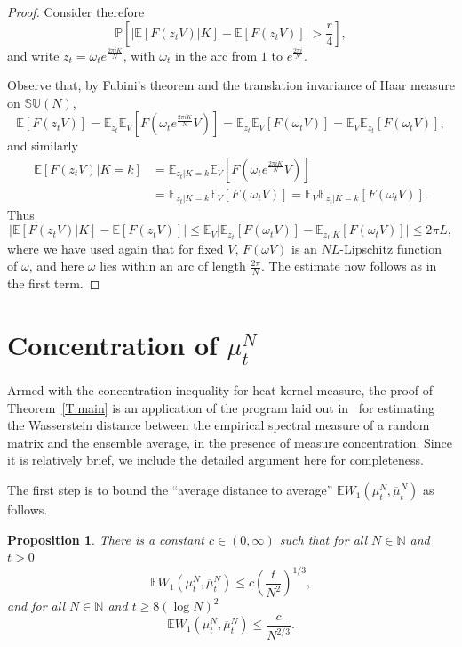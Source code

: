\documentclass[11pt]{article}
\newtheorem{prop}[theo]{Proposition}
\theoremstyle{definition}
\numberwithin{equation}{section}
\numberwithin{figure}{section}
\numberwithin{table}{section}
\newcommand{\SUnitary}[1]{\mathbb{SU}\left(#1\right)}
\newcommand{\E}{\mathbb{E}}
\newcommand{\Prob}{\mathbb{P}}
\begin{document}
\begin{proof}
Consider therefore
\[
\Prob\left[\Big|\E\left[F(z_tV)\big|K\right]-\E[F(z_tV)]\Big|>\frac{r}{4}\right],
\]
and write $z_t=\omega_te^{\frac{2\pi i K}{N}}$, with $\omega_t$ in the arc from $1$ to $e^{\frac{2\pi i}{N}}$.

Observe that, by Fubini's theorem and the translation invariance of Haar measure on $\SUnitary{N}$,
\[
\E[F(z_tV)]=\E_{z_t}\E_V[F(\omega_te^{\frac{2\pi i K}{N}}V)]=\E_{z_t}\E_V[F(\omega_tV)]=\E_V\E_{z_t}[F(\omega_tV)],
\]
and similarly
\begin{align*}
\E[F(z_tV)|K=k] &=\E_{z_t|K=k}\E_V[F(\omega_te^{\frac{2\pi i K}{N}}V)] \\
&=\E_{z_t|K=k}\E_V[F(\omega_tV)] =\E_V \E_{z_t|K=k}[F(\omega_tV)].
\end{align*}
Thus
\[
\Big|\E\left[F(z_tV)\big|K\right]-\E[F(z_tV)]\Big|\le\E_V\Big|\E_{z_t}[F(\omega_tV)]-\E_{z_t|K}[F(\omega_tV)]\Big|\le2\pi L,
\]
where we have used again that for fixed $V$, $F(\omega V)$ is an $NL$-Lipschitz function of $\omega$, and here $\omega$ lies within an arc of length $\frac{2\pi}{N}$. The estimate now follows as in the first term.
\end{proof}



\section{Concentration of \texorpdfstring{$\mu_t^N$}{mu t N}}\label{s.concentration}

Armed with the concentration inequality for heat kernel measure, the proof of Theorem~\ref{T:main} is an application of the program laid out in~\cite{MM2016} for estimating the Wasserstein distance between the empirical spectral measure of a random matrix and the ensemble average, in the presence of measure concentration. Since it is relatively brief, we include the detailed argument here for completeness.

The first step is to bound the ``average distance to average'' $\E W_1(\mu^N_t,\overline{\mu}^N_t)$ as follows.

\begin{prop}\label{T:avg-to-avg}
There is a constant $c\in(0,\infty)$ such that for all $N\in\mathbb{N}$ and $t>0$
\[
\E W_1(\mu^N_t,\overline{\mu}^N_t)\le c\left(\frac{t}{N^2}\right)^{1/3},
\]
and for all $N\in\mathbb{N}$ and $t\ge8(\log N)^2$
\[
\E W_1(\mu^N_t,\overline{\mu}^N_t)\le
\frac{c}{N^{2/3}}.
\]
\end{prop}
\end{document}
